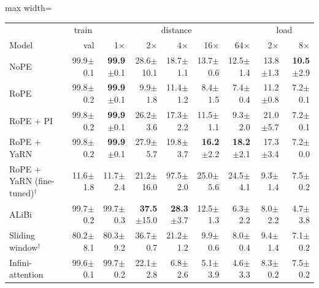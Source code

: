 \begin{table}\centering\small
\setlength{\tabcolsep}{4pt}
\begin{adjustbox}{max width=\linewidth}
\begin{tabular}{lrrrrrrrr}
\toprule
 & \multicolumn{1}{c}{train} & \multicolumn{5}{c}{distance} & \multicolumn{2}{c}{load} \\
Model & val & 1$\times$ & 2$\times$ & 4$\times$ & 16$\times$ & 64$\times$ & 2$\times$ & 8$\times$ \\
\midrule
NoPE & 99.9{\scriptsize$\pm$0.1} & \textbf{99.9}{\scriptsize$\pm$0.1} & 28.6{\scriptsize$\pm$10.1} & 18.7{\scriptsize$\pm$1.1} & 13.7{\scriptsize$\pm$0.6} & 12.5{\scriptsize$\pm$1.4} & 13.8{\scriptsize$\pm$1.3} & \textbf{10.5}{\scriptsize$\pm$2.9} \\
RoPE & 99.8{\scriptsize$\pm$0.2} & \textbf{99.9}{\scriptsize$\pm$0.1} & 9.9{\scriptsize$\pm$1.8} & 11.4{\scriptsize$\pm$1.2} & 8.4{\scriptsize$\pm$1.5} & 7.4{\scriptsize$\pm$0.4} & 11.2{\scriptsize$\pm$0.8} & 7.2{\scriptsize$\pm$0.1} \\
RoPE + PI & 99.8{\scriptsize$\pm$0.2} & \textbf{99.9}{\scriptsize$\pm$0.1} & 26.2{\scriptsize$\pm$3.6} & 17.3{\scriptsize$\pm$2.2} & 11.5{\scriptsize$\pm$1.1} & 9.3{\scriptsize$\pm$2.0} & 21.0{\scriptsize$\pm$5.7} & 7.2{\scriptsize$\pm$0.1} \\
RoPE + YaRN & 99.8{\scriptsize$\pm$0.2} & \textbf{99.9}{\scriptsize$\pm$0.1} & 27.9{\scriptsize$\pm$5.7} & 19.8{\scriptsize$\pm$3.7} & \textbf{16.2}{\scriptsize$\pm$2.2} & \textbf{18.2}{\scriptsize$\pm$2.1} & 17.3{\scriptsize$\pm$3.4} & 7.2{\scriptsize$\pm$0.0} \\
RoPE + YaRN (fine-tuned)$^\dagger$ & 11.6{\scriptsize$\pm$1.8} & 11.7{\scriptsize$\pm$2.4} & 21.2{\scriptsize$\pm$16.0} & 97.5{\scriptsize$\pm$2.0} & 25.0{\scriptsize$\pm$5.6} & 24.5{\scriptsize$\pm$4.1} & 9.3{\scriptsize$\pm$1.4} & 7.5{\scriptsize$\pm$0.2} \\
ALiBi & 99.7{\scriptsize$\pm$0.2} & 99.7{\scriptsize$\pm$0.3} & \textbf{37.5}{\scriptsize$\pm$15.0} & \textbf{28.3}{\scriptsize$\pm$3.7} & 12.5{\scriptsize$\pm$1.3} & 6.3{\scriptsize$\pm$2.2} & 8.0{\scriptsize$\pm$2.2} & 4.7{\scriptsize$\pm$3.8} \\
Sliding window$^\dagger$ & 80.2{\scriptsize$\pm$8.1} & 80.3{\scriptsize$\pm$9.2} & 36.7{\scriptsize$\pm$0.7} & 21.2{\scriptsize$\pm$1.2} & 9.9{\scriptsize$\pm$0.6} & 8.0{\scriptsize$\pm$0.4} & 9.4{\scriptsize$\pm$1.4} & 7.1{\scriptsize$\pm$0.2} \\
Infini-attention & 99.6{\scriptsize$\pm$0.1} & 99.7{\scriptsize$\pm$0.2} & 22.1{\scriptsize$\pm$2.8} & 6.8{\scriptsize$\pm$2.6} & 5.1{\scriptsize$\pm$3.9} & 4.6{\scriptsize$\pm$3.3} & 8.3{\scriptsize$\pm$0.2} & 7.5{\scriptsize$\pm$0.2} \\

\end{tabular}
\end{adjustbox}
\end{table}
